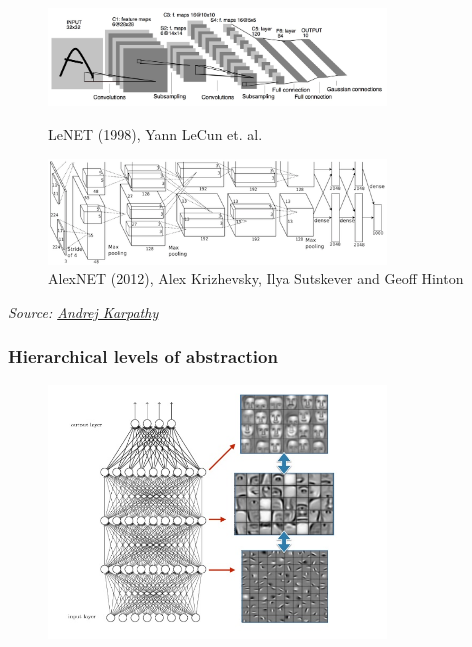 \documentclass{beamer}
\begin{document}
\begin{frame}

\begin{figure}[!h]
\begin{center}
\includegraphics[width=0.8\textwidth]{figures/lenet5.jpg}
\caption{LeNET (1998), Yann LeCun et. al.}
\par\vfill
\includegraphics[width=0.8\textwidth]{figures/alexnet_small.png}
\caption{AlexNET (2012), Alex Krizhevsky, Ilya Sutskever and Geoff Hinton}
\end{center}
\end{figure}

\tiny{\emph{Source: \href{http://cs231n.github.io/convolutional-networks/}{Andrej Karpathy}}}


\end{frame}


\begin{frame}
\frametitle{Hierarchical levels of abstraction} 

\begin{figure}[!h]
\begin{center}
\includegraphics[width=0.8\textwidth]{figures/layers.jpg}
\end{center}
\end{figure}


\end{frame}
\end{document}
